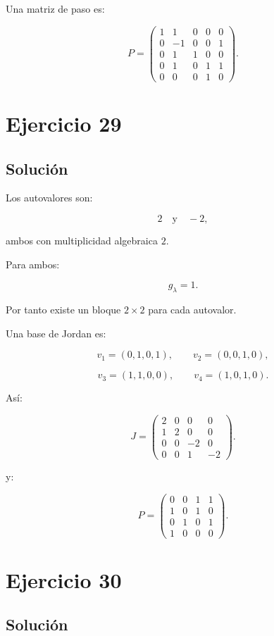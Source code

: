 \documentclass[11pt,a4paper]{article}
\begin{document}
Una matriz de paso es:

\[
\boxed{
P=
\begin{pmatrix}
1&1&0&0&0\\
0&-1&0&0&1\\
0&1&1&0&0\\
0&1&0&1&1\\
0&0&0&1&0
\end{pmatrix}.
}
\]

\section{Ejercicio 29}
\subsection{Solución}

Los autovalores son:

\[
2
\quad\text{y}\quad
-2,
\]

ambos con multiplicidad algebraica $2$.

Para ambos:

\[
g_\lambda=1.
\]

Por tanto existe un bloque $2\times2$ para cada autovalor.

Una base de Jordan es:

\[
v_1=(0,1,0,1),
\qquad
v_2=(0,0,1,0),
\]

\[
v_3=(1,1,0,0),
\qquad
v_4=(1,0,1,0).
\]

Así:

\[
\boxed{
J=
\begin{pmatrix}
2&0&0&0\\
1&2&0&0\\
0&0&-2&0\\
0&0&1&-2
\end{pmatrix}.
}
\]

y:

\[
\boxed{
P=
\begin{pmatrix}
0&0&1&1\\
1&0&1&0\\
0&1&0&1\\
1&0&0&0
\end{pmatrix}.
}
\]

\section{Ejercicio 30}
\subsection{Solución}
\end{document}

